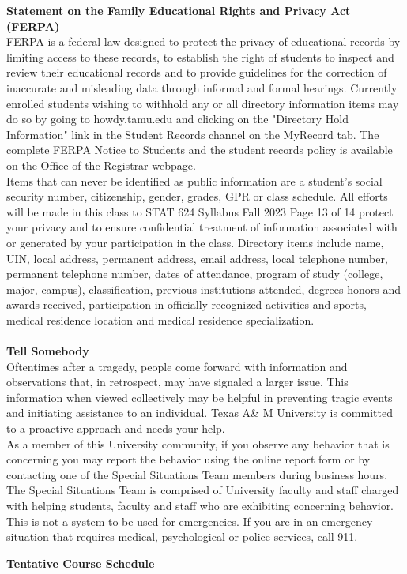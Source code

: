 \documentclass[letterpaper,10pt]{report}
\begin{document}
\textbf{Statement on the Family Educational Rights and Privacy Act (FERPA)}\\
FERPA is a federal law designed to protect the privacy of educational records by limiting access 
to these records, to establish the right of students to inspect and review their educational records 
and to provide guidelines for the correction of inaccurate and misleading data through informal 
and formal hearings. Currently enrolled students wishing to withhold any or all directory 
information items may do so by going to howdy.tamu.edu and clicking on the "Directory Hold 
Information" link in the Student Records channel on the MyRecord tab. The complete FERPA 
Notice to Students and the student records policy is available on the Office of the Registrar 
webpage.\\
Items that can never be identified as public information are a student’s social security number, 
citizenship, gender, grades, GPR or class schedule. All efforts will be made in this class to 
STAT 624 Syllabus Fall 2023
Page 13 of 14
protect your privacy and to ensure confidential treatment of information associated with or 
generated by your participation in the class.
Directory items include name, UIN, local address, permanent address, email address, local 
telephone number, permanent telephone number, dates of attendance, program of study (college, 
major, campus), classification, previous institutions attended, degrees honors and awards 
received, participation in officially recognized activities and sports, medical residence location 
and medical residence specialization.
\\
\:\
\\
\textbf{Tell Somebody}\\
Oftentimes after a tragedy, people come forward with information and observations that, in 
retrospect, may have signaled a larger issue. This information when viewed collectively may be 
helpful in preventing tragic events and initiating assistance to an individual. Texas A\& M 
University is committed to a proactive approach and needs your help. \\
As a member of this University community, if you observe any behavior that is concerning you 
may report the behavior using the online report form or by contacting one of the Special 
Situations Team members during business hours. The Special Situations Team is comprised of 
University faculty and staff charged with helping students, faculty and staff who are exhibiting 
concerning behavior.\\
This is not a system to be used for emergencies. If you are in an emergency situation that 
requires medical, psychological or police services, call 911.
\clearpage

  \textbf{Tentative Course Schedule}\\ 
  
\end{document}
